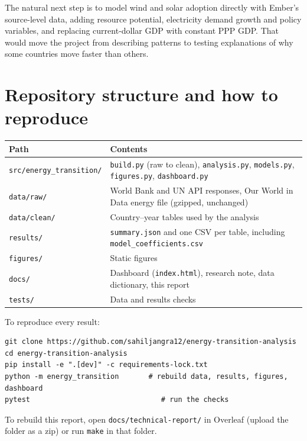 \documentclass[11pt,a4paper]{article}
\newcommand{\code}[1]{\texttt{\small #1}}
\begin{document}
The natural next step is to model wind and solar adoption directly with Ember's source-level data, adding resource potential, electricity demand growth and policy variables, and replacing current-dollar GDP with constant PPP GDP. That would move the project from describing patterns to testing explanations of why some countries move faster than others.

\clearpage



\clearpage
\appendix
\section{Repository structure and how to reproduce}\label{app:repo}

\begin{tabularx}{\textwidth}{@{}lX@{}}
\toprule
\textbf{Path} & \textbf{Contents} \\
\midrule
\code{src/energy\_transition/} & \code{build.py} (raw to clean), \code{analysis.py}, \code{models.py}, \code{figures.py}, \code{dashboard.py} \\
\code{data/raw/} & World Bank and UN API responses, Our World in Data energy file (gzipped, unchanged) \\
\code{data/clean/} & Country--year tables used by the analysis \\
\code{results/} & \code{summary.json} and one CSV per table, including \code{model\_coefficients.csv} \\
\code{figures/} & Static figures \\
\code{docs/} & Dashboard (\code{index.html}), research note, data dictionary, this report \\
\code{tests/} & Data and results checks \\
\bottomrule
\end{tabularx}

\medskip
\noindent To reproduce every result:
\begin{verbatim}
git clone https://github.com/sahiljangra12/energy-transition-analysis
cd energy-transition-analysis
pip install -e ".[dev]" -c requirements-lock.txt
python -m energy_transition       # rebuild data, results, figures, dashboard
pytest                               # run the checks
\end{verbatim}

\noindent To rebuild this report, open \code{docs/technical-report/} in Overleaf (upload the folder as a zip) or run \code{make} in that folder.
\end{document}
